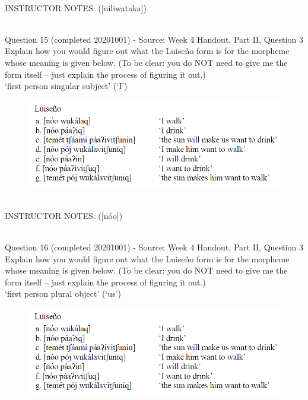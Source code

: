 \documentclass[12pt]{article}
\begin{document}
~\\
INSTRUCTOR NOTES: ([niliwataka])


~\\

{\large Question 15} (completed 20201001) - Source: Week 4 Handout, Part II, Question 3\\

Explain how you would figure out what the Luiseño form is for the morpheme whose meaning is given below. (To be clear: you do NOT need to give me the form itself -- just explain the process of figuring it out.)\\

‘first person singular subject’ (‘I’)

\begin{figure}[H]
\includegraphics{../images/luiseno.png}
\end{figure}

~\\
INSTRUCTOR NOTES: ([nóo])


~\\

{\large Question 16} (completed 20201001) - Source: Week 4 Handout, Part II, Question 3\\

Explain how you would figure out what the Luiseño form is for the morpheme whose meaning is given below. (To be clear: you do NOT need to give me the form itself -- just explain the process of figuring it out.)\\

‘first person plural object’ (‘us’)

\begin{figure}[H]
\includegraphics{../images/luiseno.png}
\end{figure}
\end{document}
